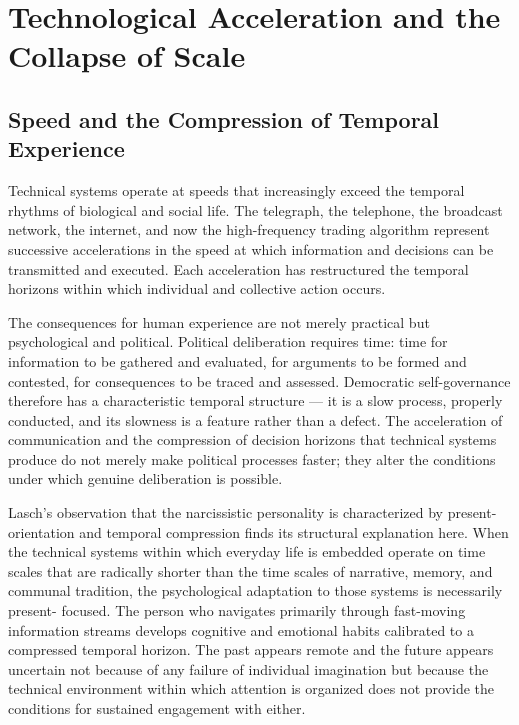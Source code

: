 \documentclass[12pt]{memoir}
\begin{document}
\section{Technological Acceleration and the Collapse of Scale}
\label{sec:scale}

\subsection{Speed and the Compression of Temporal Experience}

Technical systems operate at speeds that increasingly exceed the temporal rhythms of
biological and social life. The telegraph, the telephone, the broadcast network, the
internet, and now the high-frequency trading algorithm represent successive accelerations
in the speed at which information and decisions can be transmitted and executed.
Each acceleration has restructured the temporal horizons within which individual and
collective action occurs.

The consequences for human experience are not merely practical but psychological and
political. Political deliberation requires time: time for information to be gathered
and evaluated, for arguments to be formed and contested, for consequences to be traced
and assessed. Democratic self-governance therefore has a characteristic temporal
structure — it is a slow process, properly conducted, and its slowness is a feature
rather than a defect. The acceleration of communication and the compression of
decision horizons that technical systems produce do not merely make political processes
faster; they alter the conditions under which genuine deliberation is possible.

Lasch's observation that the narcissistic personality is characterized by present-
orientation and temporal compression finds its structural explanation here. When the
technical systems within which everyday life is embedded operate on time scales that
are radically shorter than the time scales of narrative, memory, and communal
tradition, the psychological adaptation to those systems is necessarily present-
focused. The person who navigates primarily through fast-moving information streams
develops cognitive and emotional habits calibrated to a compressed temporal horizon.
The past appears remote and the future appears uncertain not because of any failure
of individual imagination but because the technical environment within which attention
is organized does not provide the conditions for sustained engagement with either.
\end{document}
